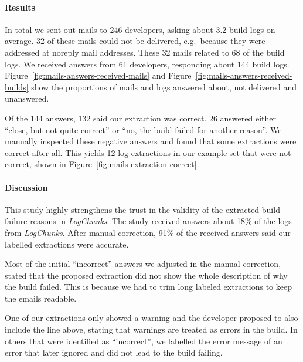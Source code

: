 \documentclass[\myrootdir/main.tex]{subfiles}
\begin{document}
\paragraph{Results}
In total we sent out mails to 246 developers, asking about 3.2 build logs on average.
32 of these mails could not be delivered, e.g.\ because they were addressed at noreply mail addresses.
These 32 mails related to 68 of the build logs.
We received answers from 61 developers, responding about 144 build logs.
Figure~\ref{fig:mails-answers-received-mails} and Figure~\ref{fig:mails-answers-received-builds} show the proportions of mails and logs answered about, not delivered and unanswered.

Of the 144 answers, 132 said our extraction was correct.
26 answered either ``close, but not quite correct'' or ``no, the build failed for another reason''.
We manually inspected these negative answers and found that some extractions were correct after all.
This yields 12 log extractions in our example set that were not correct, shown in Figure~\ref{fig:mails-extraction-correct}.

\paragraph{Discussion}
This study highly strengthens the trust in the validity of the extracted build failure reasons in \emph{LogChunks}.
The study received answers about 18\% of the logs from \emph{LogChunks}.
After manual correction, 91\% of the received answers said our labelled extractions were accurate.

Most of the initial ``incorrect'' answers we adjusted in the manual correction, stated that the proposed extraction did not show the whole description of why the build failed.
This is because we had to trim long labeled extractions to keep the emails readable.

One of our extractions only showed a warning and the developer proposed to also include the line above, stating that warnings are treated as errors in the build.
In others that were identified as ``incorrect'', we labelled the error message of an error that later ignored and did not lead to the build failing.
\end{document}
